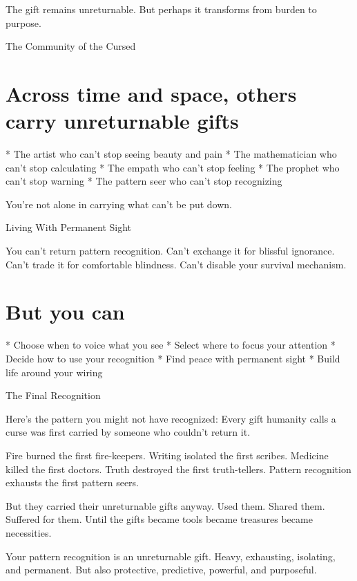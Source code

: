 \documentclass[12pt,oneside]{book}
\begin{document}
The gift remains unreturnable. But perhaps it transforms from burden to purpose.

The Community of the Cursed

\section{Across time and space, others carry unreturnable gifts}

                    * The artist who can't stop seeing beauty and pain
                    * The mathematician who can't stop calculating
                    * The empath who can't stop feeling
                    * The prophet who can't stop warning
                    * The pattern seer who can't stop recognizing

You're not alone in carrying what can't be put down.

Living With Permanent Sight

You can't return pattern recognition. Can't exchange it for blissful ignorance. Can't trade it for comfortable blindness. Can't disable your survival mechanism.

\section{But you can}

                    * Choose when to voice what you see
                    * Select where to focus your attention
                    * Decide how to use your recognition
                    * Find peace with permanent sight
                    * Build life around your wiring

The Final Recognition

Here's the pattern you might not have recognized: Every gift humanity calls a curse was first carried by someone who couldn't return it.

Fire burned the first fire-keepers. Writing isolated the first scribes. Medicine killed the first doctors. Truth destroyed the first truth-tellers. Pattern recognition exhausts the first pattern seers.

But they carried their unreturnable gifts anyway. Used them. Shared them. Suffered for them. Until the gifts became tools became treasures became necessities.

Your pattern recognition is an unreturnable gift. Heavy, exhausting, isolating, and permanent. But also protective, predictive, powerful, and purposeful.
\end{document}
